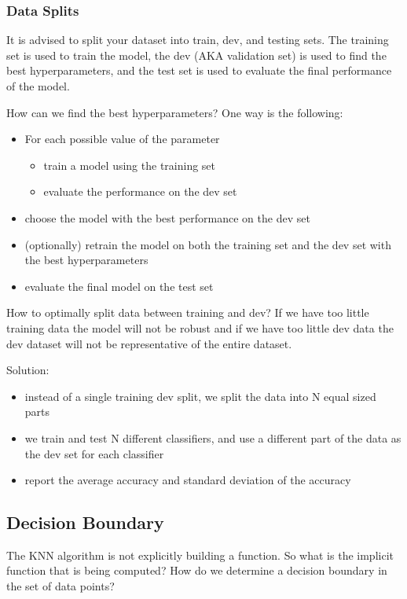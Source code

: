 \subsubsection*{Data Splits}
It is advised to split your dataset into train, dev, and testing sets. The training set is used to train the model, the dev (AKA validation set) is used to find the best hyperparameters, and the test set is used to evaluate the final performance of the model. 

How can we find the best hyperparameters? One way is the following:
\begin{itemize}
    \item For each possible value of the parameter
    \begin{itemize}
        \item train a model using the training set
        \item evaluate the performance on the dev set
    \end{itemize}
    \item choose the model with the best performance on the dev set
    \item (optionally) retrain the model on both the training set and the dev set with the best hyperparameters
    \item evaluate the final model on the test set
\end{itemize}

How to optimally split data between training and dev? If we have too little training data the model will not be robust and if we have too little dev data the dev dataset will not be representative of the entire dataset.

Solution: 
\begin{itemize}
    \item instead of a single training dev split, we split the data into N equal sized parts
    \item we train and test N different classifiers, and use a different part of the data as the dev set for each classifier
    \item report the average accuracy and standard deviation of the accuracy
\end{itemize}

\subsection*{Decision Boundary}
The KNN algorithm is not explicitly building a function. So what is the implicit function that is being computed? How do we determine a decision boundary in the set of data points?

